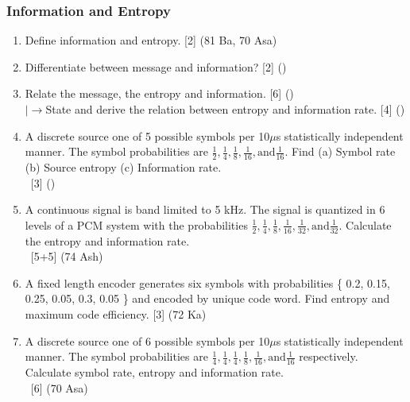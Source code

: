 \documentclass[12pt]{article}
\newcommand{\lb}{\\$\left|\rightarrow\right.$}
\newcommand{\enter}{\\\textcolor{white}{1}}
\begin{document}
    \subsubsection{Information and Entropy}
    	\begin{enumerate}
    		\item Define information and entropy. \hfill [2] (81 Ba, 70 Asa)
    		
    		\item Differentiate between message and information? \hfill [2] ()
    		
    		\item Relate the message, the entropy and information. \hfill [6] ()
    		\lb State and derive the relation between entropy and information rate. \hfill [4] ()

    		\item A discrete source one of 5 possible symbols per 10$\mu$s statistically independent manner. The symbol probabilities are $\frac{1}{2}, \frac{1}{4}, \frac{1}{8}, \frac{1}{16}, \text{and} \frac{1}{16}$. Find (a) Symbol rate (b) Source entropy (c) Information rate.
          \enter\hfill [3] ()

    		\item A continuous signal is band limited to 5 kHz. The signal is quantized in 6 levels of a PCM system with the probabilities $\frac{1}{2}, \frac{1}{4}, \frac{1}{8}, \frac{1}{16}, \frac{1}{32}, \text{and} \frac{1}{32}$. Calculate the entropy and information rate. 
          \enter\hfill [5+5] (74 Ash)
    		
    		\item A fixed length encoder generates six symbols with probabilities \{ 0.2, 0.15, 0.25, 0.05, 0.3, 0.05 \} and encoded by unique code word. Find entropy and maximum code efficiency. \hfill [3] (72 Ka)
    		
    		\item A discrete source one of 6 possible symbols per 10$\mu$s statistically independent manner. The symbol probabilities are $\frac{1}{4}, \frac{1}{4}, \frac{1}{4}, \frac{1}{8}, \frac{1}{16}, \text{and} \frac{1}{16}$ respectively. Calculate symbol rate, entropy and information rate.
          \enter\hfill [6] (70 Asa)
    	\end{enumerate}
    
\end{document}
